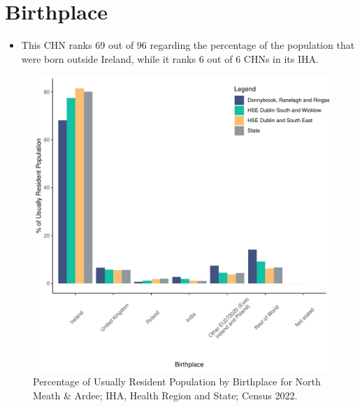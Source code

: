 \documentclass{article}
\begin{document}
\section{Birthplace}\label{sect:Birth}
\begin{itemize}
\item This CHN ranks  69 out of 96 regarding the percentage of the population that were born outside Ireland, while it ranks  6 out of 6 CHNs in its IHA.
\end{itemize}
\begin{figure}[H]
	\centering
	\includegraphics[width = 130mm]{../figures/BirthED.pdf}
	\caption{Percentage of Usually Resident Population by Birthplace for North Meath & Ardee; IHA, Health Region and State; Census 2022.}
	\label{fig:vbnv}
	\end{figure}
	
\end{document}
